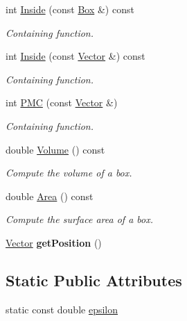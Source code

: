 \begin{DoxyCompactItemize}
\item 
int \hyperlink{class_box_abc15073158a80e02f4b1fb32b50e1eb6}{\-Inside} (const \hyperlink{class_box}{\-Box} \&) const 
\begin{DoxyCompactList}\small\item\em \-Containing function. \end{DoxyCompactList}\item 
int \hyperlink{class_box_aa3a80d26840216d02e1096e28333d65b}{\-Inside} (const \hyperlink{class_vector}{\-Vector} \&) const 
\begin{DoxyCompactList}\small\item\em \-Containing function. \end{DoxyCompactList}\item 
int \hyperlink{class_box_afb71788385a4f8ff91c6d8385972dde4}{\-P\-M\-C} (const \hyperlink{class_vector}{\-Vector} \&)
\begin{DoxyCompactList}\small\item\em \-Containing function. \end{DoxyCompactList}\item 
\hypertarget{class_box_ae6092debba95840365b79a02f60d245c}{
double \hyperlink{class_box_ae6092debba95840365b79a02f60d245c}{\-Volume} () const }
\label{class_box_ae6092debba95840365b79a02f60d245c}

\begin{DoxyCompactList}\small\item\em \-Compute the volume of a box. \end{DoxyCompactList}\item 
\hypertarget{class_box_a8e0a710afacb0bdeb3f751b40ab575b2}{
double \hyperlink{class_box_a8e0a710afacb0bdeb3f751b40ab575b2}{\-Area} () const }
\label{class_box_a8e0a710afacb0bdeb3f751b40ab575b2}

\begin{DoxyCompactList}\small\item\em \-Compute the surface area of a box. \end{DoxyCompactList}\item 
\hypertarget{class_box_a7bde7216a8ec3c840bdfd171f6c9b170}{
\hyperlink{class_vector}{\-Vector} {\bfseries get\-Position} ()}
\label{class_box_a7bde7216a8ec3c840bdfd171f6c9b170}

\end{DoxyCompactItemize}
\subsection*{\-Static \-Public \-Attributes}
\begin{DoxyCompactItemize}
\item 
static const double \hyperlink{class_box_ab038c94f04821a9ab0e0313819e5187c}{epsilon}
\end{DoxyCompactItemize}
